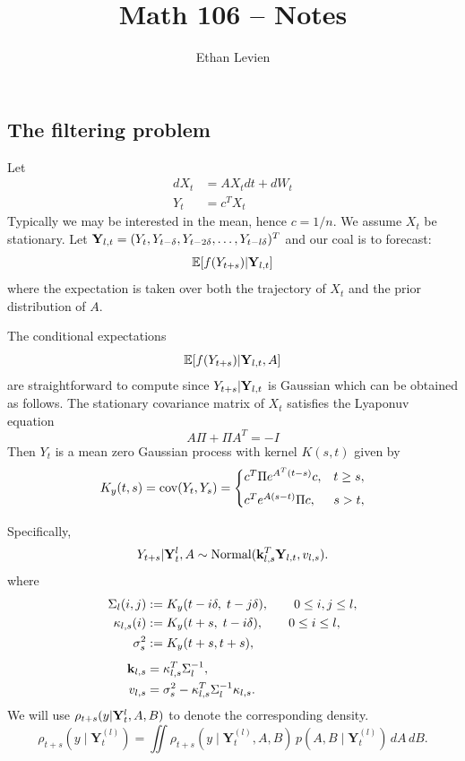\documentclass[11pt]{article}
\title{Math 106 -- Notes }
\author{Ethan Levien}
\date{}
\begin{document}
\maketitle


\subsection*{The filtering problem}
Let
\begin{align}
dX_t &= AX_tdt + dW_t\\
Y_t &= c^TX_t
\end{align}
Typically we may be interested in the mean, hence $c = 1/n$. 
We assume $X_t$ be stationary. 
Let ${\bf Y}_{l,t}= (Y_t,Y_{t-\delta},Y_{t-2\delta},\dots,Y_{t-l\delta})^T$
and our coal is to forecast: 
\begin{equation}
{\mathbb E}[f(Y_{t+s})|{\bf Y}_{l,t}]
\end{equation} 
where the expectation is taken over both the trajectory of $X_t$ and the prior distribution of $A$. 

 The conditional expectations
\begin{equation}
{\mathbb E}[f(Y_{t+s})|{\bf Y}_{l,t},A]
\end{equation}
are straightforward to compute since $Y_{t+s}|{\bf Y}_{l,t}$ is Gaussian which can be obtained as follows. 
 The stationary covariance matrix of $X_t$ satisfies the Lyaponuv equation 
\begin{equation}
A\Pi + \Pi A^T = - I
\end{equation}
Then $Y_t$ is a mean zero Gaussian process with kernel $K(s,t)$ given by 
\begin{equation}
K_y(t,s) = {\rm cov}(Y_t,Y_s) 
=
\begin{cases}
c^T \Pi e^{A^T (t-s)}c, & t\ge s,\\[4pt]
c^T e^{A(s-t)}\Pi c, & s>t,
\end{cases}
\end{equation} 


 Specifically,  
\begin{equation}
Y_{t+s}|{\bf Y}_t^l,A \sim {\rm Normal}({\bf k}_{l,s}^T {\bf Y}_{l,t},v_{l,s}). 
\end{equation}
where 
\begin{align}
\Sigma_l(i,j) &:= K_y(t-i\delta,\;t-j\delta),\qquad 0\le i,j\le l,\\
\kappa_{l,s}(i) &:= K_y(t+s,\;t-i\delta),\qquad 0\le i\le l,\\
\sigma_s^2 &:= K_y(t+s,t+s),\\[4pt]
{\bf k}_{l,s} &= \kappa_{l,s}^T \Sigma_l^{-1},\\
v_{l,s} &= \sigma_s^2 - \kappa_{l,s}^T\Sigma_l^{-1}\kappa_{l,s}.
\end{align}
We will use $\rho_{t+s}(y|{\bf Y}_t^l,A,B)$ to denote the corresponding density.
\begin{equation}
\rho_{t+s}(y\mid \mathbf Y_t^{(l)})
=\iint \rho_{t+s}(y\mid \mathbf Y_t^{(l)},A,B)\,p(A,B\mid \mathbf Y_t^{(l)})\,dA\,dB.
\end{equation}
\end{document}
